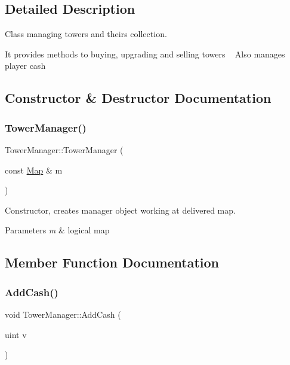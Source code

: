 \subsection{Detailed Description}
Class managing towers and theirs collection. 

It provides methods to buying, upgrading and selling towers ~\newline
Also manages player cash 

\subsection{Constructor \& Destructor Documentation}
\mbox{\label{class_tower_manager_a709c5b86ae62f50820da54d535b83342}} 
\subsubsection{\texorpdfstring{Tower\+Manager()}{TowerManager()}}
{\footnotesize\ttfamily Tower\+Manager\+::\+Tower\+Manager (\begin{DoxyParamCaption}\item[{const \mbox{\hyperlink{class_map}{Map}} \&}]{m }\end{DoxyParamCaption})}



Constructor, creates manager object working at delivered map. 


\begin{DoxyParams}{Parameters}
{\em m} & logical map \\
\hline
\end{DoxyParams}


\subsection{Member Function Documentation}
\mbox{\label{class_tower_manager_a67c7741801ff0935ea2b0a6181768532}} 
\subsubsection{\texorpdfstring{Add\+Cash()}{AddCash()}}
{\footnotesize\ttfamily void Tower\+Manager\+::\+Add\+Cash (\begin{DoxyParamCaption}\item[{uint}]{v }\end{DoxyParamCaption})}




